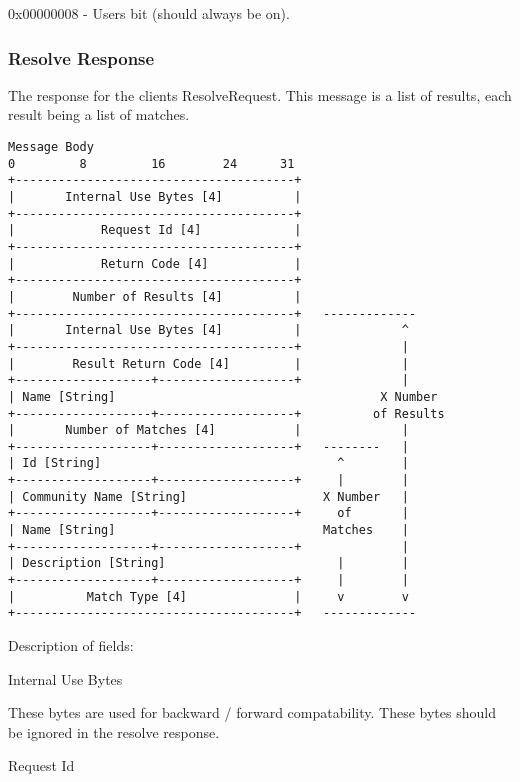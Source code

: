 \documentclass[titlepage,oneside]{book}
\begin{document}
\subpar{}    0x00000008 - Users bit (should always be on).

\subsubsection{Resolve Response}

\par{}The response for the clients ResolveRequest. This message is a list of
results, each result being a list of matches.

\begin{verbatim}
Message Body
0         8         16        24      31
+---------------------------------------+
|       Internal Use Bytes [4]          |
+---------------------------------------+
|            Request Id [4]             |
+---------------------------------------+
|            Return Code [4]            |
+---------------------------------------+
|        Number of Results [4]          |
+---------------------------------------+   -------------
|       Internal Use Bytes [4]          |              ^
+---------------------------------------+              |
|        Result Return Code [4]         |              |
+-------------------+-------------------+              |
| Name [String]                                     X Number
+-------------------+-------------------+          of Results
|       Number of Matches [4]           |              |
+-------------------+-------------------+   --------   |
| Id [String]                                 ^        |
+-------------------+-------------------+     |        |
| Community Name [String]                   X Number   |
+-------------------+-------------------+     of       |
| Name [String]                             Matches    |
+-------------------+-------------------+              |
| Description [String]                        |        |
+-------------------+-------------------+     |        |
|          Match Type [4]               |     v        v
+---------------------------------------+   -------------
\end{verbatim}

\par{} Description of fields:

\par{} Internal Use Bytes

\subpar{}  These bytes are used for backward / forward compatability. These
  bytes should be ignored in the resolve response.

\par{} Request Id
\end{document}
